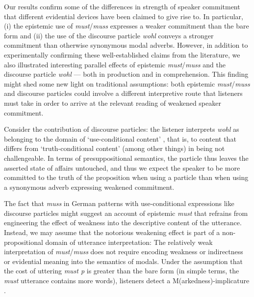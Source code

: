 \documentclass[11pt]{article}
\begin{document}
Our results confirm some of the differences in strength of speaker commitment that different evidential devices have been claimed to give rise to. In particular, (i) the epistemic use of \emph{must}/\emph{muss} expresses a weaker commitment than the bare form and (ii) the use of the discourse particle \emph{wohl} conveys a stronger commitment than otherwise synonymous modal adverbs. However, in addition to experimentally confirming these well-established claims from the literature, we also illustrated interesting parallel effects of epistemic \emph{must}/\emph{muss} and the discourse particle \emph{wohl} — both in production and in comprehension. This finding might shed some new light on traditional assumptions: both epistemic  \emph{must}/\emph{muss} and discourse particles could involve a different interpretive route that listeners must take in order to arrive at the relevant reading of weakened speaker commitment. %

Consider the contribution of discourse particles: the listener interprets \emph{wohl} as belonging to the domain of ‘use-conditional content’ \citep{Recanati2004}, that is, to content that differs from ‘truth-conditional content’ (among other things) in being not challengeable. In terms of presuppositional semantics, the particle thus leaves the asserted state of affairs untouched, and thus we expect the speaker to be more committed to the truth of the proposition when using a particle than when using a synonymous adverb expressing weakened commitment. %

The fact that \emph{muss} in German patterns with use-conditional expressions like discourse particles might suggest an account of epistemic \emph{must} that refrains from engineering the effect of weakness into the descriptive content of the utterance. Instead, we may assume that the notorious weakening effect is part of a non-propositional domain of utterance interpretation: The relatively weak interpretation of \emph{must}/\emph{muss} does not require encoding weakness or indirectness or evidential meaning into the semantics of modals. Under the assumption that the cost of uttering \emph{must p} is greater than the bare form (in simple terms, the \emph{must} utterance contains more words), listeners detect a M(arkedness)-implicature \citep{levinson2000}. 
\end{document}
